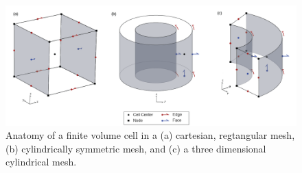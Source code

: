 \begin{figure}
    \begin{center}
    \includegraphics[width=\columnwidth]{figures/casing_software/finiteVolume-02.png}
    \end{center}
\caption{
    Anatomy of a finite volume cell in a (a) cartesian,
    regtangular mesh, (b) cylindrically symmetric mesh, and
    (c) a three dimensional cylindrical mesh.
}
\label{fig:CylFiniteVolume}
\end{figure}
